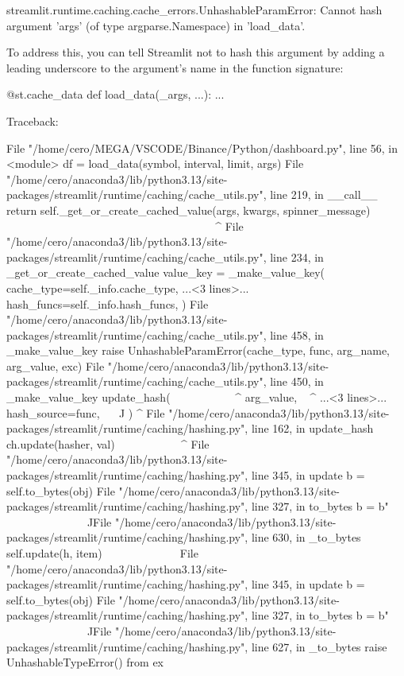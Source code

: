 streamlit.runtime.caching.cache_errors.UnhashableParamError: Cannot hash argument 'args' (of type argparse.Namespace) in 'load_data'.

To address this, you can tell Streamlit not to hash this argument by adding a leading underscore to the argument's name in the function signature:

@st.cache_data
def load_data(_args, ...):
    ...

Traceback:

File "/home/cero/MEGA/VSCODE/Binance/Python/dashboard.py", line 56, in <module>
    df = load_data(symbol, interval, limit, args)
File "/home/cero/anaconda3/lib/python3.13/site-packages/streamlit/runtime/caching/cache_utils.py", line 219, in __call__
    return self._get_or_create_cached_value(args, kwargs, spinner_message)
           ~~~~~~~~~~~~~~~~~~~~~~~~~~~~~~~~^^^^^^^^^^^^^^^^^^^^^^^^^^^^^^^
File "/home/cero/anaconda3/lib/python3.13/site-packages/streamlit/runtime/caching/cache_utils.py", line 234, in _get_or_create_cached_value
    value_key = _make_value_key(
        cache_type=self._info.cache_type,
    ...<3 lines>...
        hash_funcs=self._info.hash_funcs,
    )
File "/home/cero/anaconda3/lib/python3.13/site-packages/streamlit/runtime/caching/cache_utils.py", line 458, in _make_value_key
    raise UnhashableParamError(cache_type, func, arg_name, arg_value, exc)
File "/home/cero/anaconda3/lib/python3.13/site-packages/streamlit/runtime/caching/cache_utils.py", line 450, in _make_value_key
    update_hash(
    ~~~~~~~~~~~^
        arg_value,
        ^^^^^^^^^^
    ...<3 lines>...
        hash_source=func,
        ^^^^^^^^^^^^^^^^^
    )
    ^
File "/home/cero/anaconda3/lib/python3.13/site-packages/streamlit/runtime/caching/hashing.py", line 162, in update_hash
    ch.update(hasher, val)
    ~~~~~~~~~^^^^^^^^^^^^^
File "/home/cero/anaconda3/lib/python3.13/site-packages/streamlit/runtime/caching/hashing.py", line 345, in update
    b = self.to_bytes(obj)
File "/home/cero/anaconda3/lib/python3.13/site-packages/streamlit/runtime/caching/hashing.py", line 327, in to_bytes
    b = b"%
                           ~~~~~~~~~~~~~~^^^^^
File "/home/cero/anaconda3/lib/python3.13/site-packages/streamlit/runtime/caching/hashing.py", line 630, in _to_bytes
    self.update(h, item)
    ~~~~~~~~~~~^^^^^^^^^
File "/home/cero/anaconda3/lib/python3.13/site-packages/streamlit/runtime/caching/hashing.py", line 345, in update
    b = self.to_bytes(obj)
File "/home/cero/anaconda3/lib/python3.13/site-packages/streamlit/runtime/caching/hashing.py", line 327, in to_bytes
    b = b"%
                           ~~~~~~~~~~~~~~^^^^^
File "/home/cero/anaconda3/lib/python3.13/site-packages/streamlit/runtime/caching/hashing.py", line 627, in _to_bytes
    raise UnhashableTypeError() from ex
